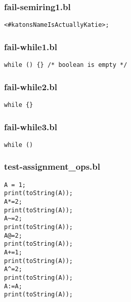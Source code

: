 \subsubsection{fail-semiring1.bl}
\begin{lstlisting}
<#katonsNameIsActuallyKatie>;\end{lstlisting}
\subsubsection{fail-while1.bl}
\begin{lstlisting}
while () {} /* boolean is empty */\end{lstlisting}
\subsubsection{fail-while2.bl}
\begin{lstlisting}
while {}\end{lstlisting}
\subsubsection{fail-while3.bl}
\begin{lstlisting}
while ()\end{lstlisting}
\subsubsection{test-assignment\_ops.bl}
\begin{lstlisting}
A = 1;
print(toString(A));
A*=2;
print(toString(A));
A~=2;
print(toString(A));
A@=2;
print(toString(A));
A+=1;
print(toString(A));
A^=2;
print(toString(A));
A:=A;
print(toString(A));
\end{lstlisting}
